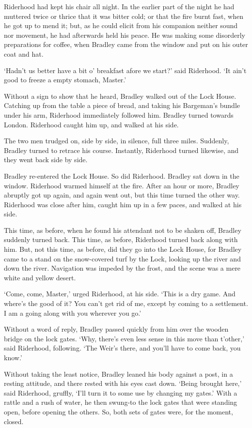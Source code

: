 Riderhood had kept his chair all night. In the earlier part of the night
he had muttered twice or thrice that it was bitter cold; or that the
fire burnt fast, when he got up to mend it; but, as he could elicit from
his companion neither sound nor movement, he had afterwards held his
peace. He was making some disorderly preparations for coffee, when
Bradley came from the window and put on his outer coat and hat.

‘Hadn’t us better have a bit o’ breakfast afore we start?’ said
Riderhood. ‘It ain’t good to freeze a empty stomach, Master.’

Without a sign to show that he heard, Bradley walked out of the Lock
House. Catching up from the table a piece of bread, and taking his
Bargeman’s bundle under his arm, Riderhood immediately followed him.
Bradley turned towards London. Riderhood caught him up, and walked at
his side.

The two men trudged on, side by side, in silence, full three miles.
Suddenly, Bradley turned to retrace his course. Instantly, Riderhood
turned likewise, and they went back side by side.

Bradley re-entered the Lock House. So did Riderhood. Bradley sat down in
the window. Riderhood warmed himself at the fire. After an hour or more,
Bradley abruptly got up again, and again went out, but this time turned
the other way. Riderhood was close after him, caught him up in a few
paces, and walked at his side.

This time, as before, when he found his attendant not to be shaken off,
Bradley suddenly turned back. This time, as before, Riderhood turned
back along with him. But, not this time, as before, did they go into the
Lock House, for Bradley came to a stand on the snow-covered turf by the
Lock, looking up the river and down the river. Navigation was impeded by
the frost, and the scene was a mere white and yellow desert.

‘Come, come, Master,’ urged Riderhood, at his side. ‘This is a dry game.
And where’s the good of it? You can’t get rid of me, except by coming to
a settlement. I am a going along with you wherever you go.’

Without a word of reply, Bradley passed quickly from him over the wooden
bridge on the lock gates. ‘Why, there’s even less sense in this move
than t’other,’ said Riderhood, following. ‘The Weir’s there, and you’ll
have to come back, you know.’

Without taking the least notice, Bradley leaned his body against a post,
in a resting attitude, and there rested with his eyes cast down. ‘Being
brought here,’ said Riderhood, gruffly, ‘I’ll turn it to some use by
changing my gates.’ With a rattle and a rush of water, he then swung-to
the lock gates that were standing open, before opening the others. So,
both sets of gates were, for the moment, closed.

